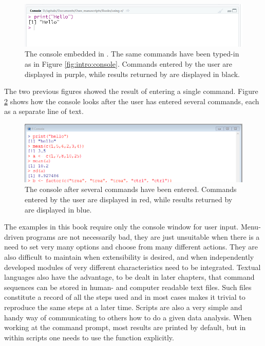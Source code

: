\documentclass[krantz2]{krantz}\usepackage{knitr}%
\begin{document}
\begin{figure}
  \centering
  \includegraphics[width=\linewidth]{figures/r-console-rstudio}
  \caption[The R console]{The \Rpgrm console embedded in \RStudio. The same commands have been typed-in as in Figure \ref{fig:intro:console}. Commands entered by the user are displayed in purple, while results returned by \Rpgrm are displayed in black.}\label{fig:intro:console:rstudio}
\end{figure}

The two previous figures showed the result of entering a single command. Figure \ref{fig:intro:console:capture} shows how the console looks after the user has entered several commands, each as a separate line of text.

\begin{figure}
  \centering
  \includegraphics[width=\linewidth]{figures/r-console-capture}
  \caption[The R console]{The \Rpgrm console after several commands have been entered. Commands entered by the user are displayed in red, while results returned by \Rpgrm are displayed in blue.}\label{fig:intro:console:capture}
\end{figure}

The examples in this book require only the console window for user input. Menu-driven programs are not necessarily bad, they are just unsuitable when there is a need to set very many options and choose from many different actions. They are also difficult to maintain when extensibility is desired, and when independently developed modules of very different characteristics need to be integrated. Textual languages also have the advantage, to be dealt in later chapters, that command sequences can be stored in human- and computer readable text files. Such files constitute a record of all the steps used and in most cases makes it trivial to reproduce the same steps at a later time. Scripts are also a very simple and handy way of communicating to others how to do a given data analysis. When working at the command prompt, most results are printed by default, but in within scripts one needs to use the function  explicitly.
\end{document}
